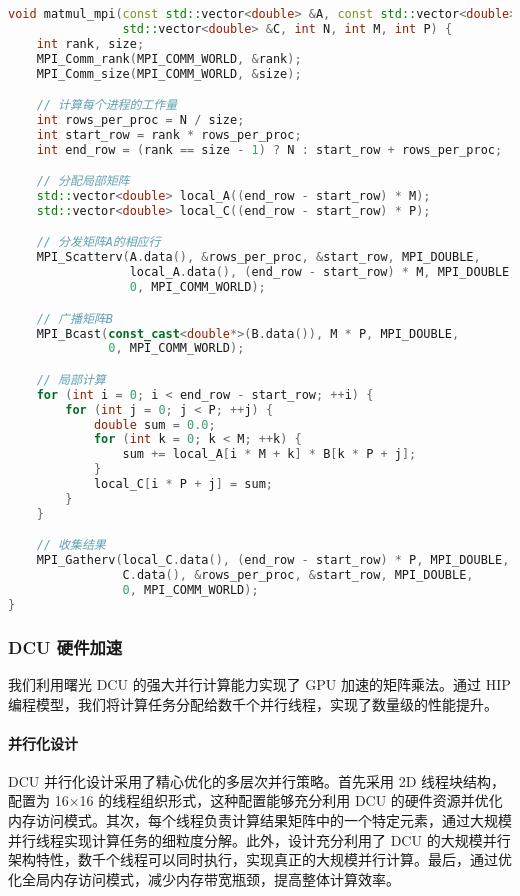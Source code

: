 \documentclass[a4paper]{article}
\begin{document}
\begin{lstlisting}[language=C++]
void matmul_mpi(const std::vector<double> &A, const std::vector<double> &B,
                std::vector<double> &C, int N, int M, int P) {
    int rank, size;
    MPI_Comm_rank(MPI_COMM_WORLD, &rank);
    MPI_Comm_size(MPI_COMM_WORLD, &size);

    // 计算每个进程的工作量
    int rows_per_proc = N / size;
    int start_row = rank * rows_per_proc;
    int end_row = (rank == size - 1) ? N : start_row + rows_per_proc;

    // 分配局部矩阵
    std::vector<double> local_A((end_row - start_row) * M);
    std::vector<double> local_C((end_row - start_row) * P);

    // 分发矩阵A的相应行
    MPI_Scatterv(A.data(), &rows_per_proc, &start_row, MPI_DOUBLE,
                 local_A.data(), (end_row - start_row) * M, MPI_DOUBLE, 
                 0, MPI_COMM_WORLD);

    // 广播矩阵B
    MPI_Bcast(const_cast<double*>(B.data()), M * P, MPI_DOUBLE, 
              0, MPI_COMM_WORLD);

    // 局部计算
    for (int i = 0; i < end_row - start_row; ++i) {
        for (int j = 0; j < P; ++j) {
            double sum = 0.0;
            for (int k = 0; k < M; ++k) {
                sum += local_A[i * M + k] * B[k * P + j];
            }
            local_C[i * P + j] = sum;
        }
    }

    // 收集结果
    MPI_Gatherv(local_C.data(), (end_row - start_row) * P, MPI_DOUBLE,
                C.data(), &rows_per_proc, &start_row, MPI_DOUBLE, 
                0, MPI_COMM_WORLD);
}
\end{lstlisting}

\subsubsection{DCU 硬件加速}

我们利用曙光 DCU 的强大并行计算能力实现了 GPU 加速的矩阵乘法。通过 HIP 编程模型，我们将计算任务分配给数千个并行线程，实现了数量级的性能提升。

\paragraph{并行化设计}

DCU 并行化设计采用了精心优化的多层次并行策略。首先采用 2D 线程块结构，配置为 16×16 的线程组织形式，这种配置能够充分利用 DCU 的硬件资源并优化内存访问模式。其次，每个线程负责计算结果矩阵中的一个特定元素，通过大规模并行线程实现计算任务的细粒度分解。此外，设计充分利用了 DCU 的大规模并行架构特性，数千个线程可以同时执行，实现真正的大规模并行计算。最后，通过优化全局内存访问模式，减少内存带宽瓶颈，提高整体计算效率。
\end{document}
